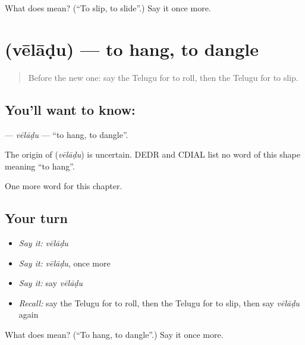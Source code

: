\begin{tcolorbox}[breakable,colback=teal!4,colframe=teal!35!black,title={Before you move on}]
What does  mean? (\textquotedblleft{}To slip, to slide\textquotedblright{}.) Say it once more.
\end{tcolorbox}
\section[\texorpdfstring{\te{వేలాడు} (vēlāḍu)}{వేలాడు (vēlāḍu)}]{ (vēlāḍu) — to hang, to dangle}

\label{lesson:TE-C206-veladu}



\begin{quote}
Before the new one: say the Telugu for to roll, then the Telugu for to slip.
\end{quote}

\subsection*{You'll want to know: }
\textbf{} — \emph{vēlāḍu} — \textquotedblleft{}to hang, to dangle\textquotedblright{}.

\begin{cousinweb}
The origin of \textbf{} (\emph{vēlāḍu}) is uncertain. DEDR and CDIAL list no word of this shape meaning \textquotedblleft{}to hang\textquotedblright{}.
\end{cousinweb}

\begin{grammarlens}[title={What you've built}]
One more word for this chapter.
\end{grammarlens}

\subsection*{Your turn}
\begin{itemize}
\raggedright
  \item \emph{Say it:} \emph{vēlāḍu}
  \item \emph{Say it:} \emph{vēlāḍu}, once more
  \item \emph{Say it:} say \emph{vēlāḍu}
  \item \emph{Recall:} say the Telugu for to roll, then the Telugu for to slip, then say \emph{vēlāḍu} again
\end{itemize}

\begin{tcolorbox}[breakable,colback=teal!4,colframe=teal!35!black,title={Before you move on}]
What does  mean? (\textquotedblleft{}To hang, to dangle\textquotedblright{}.) Say it once more.
\end{tcolorbox}
